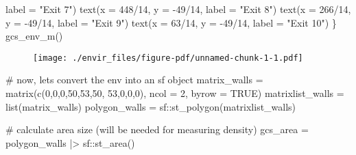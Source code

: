 \documentclass[
  letterpaper,
  DIV=11,
  numbers=noendperiod]{scrreprt}
\newenvironment{Shaded}{\begin{snugshade}}{\end{snugshade}}
\newcommand{\AttributeTok}[1]{\textcolor[rgb]{0.40,0.45,0.13}{#1}}
\newcommand{\CommentTok}[1]{\textcolor[rgb]{0.37,0.37,0.37}{#1}}
\newcommand{\ConstantTok}[1]{\textcolor[rgb]{0.56,0.35,0.01}{#1}}
\newcommand{\DecValTok}[1]{\textcolor[rgb]{0.68,0.00,0.00}{#1}}
\newcommand{\FunctionTok}[1]{\textcolor[rgb]{0.28,0.35,0.67}{#1}}
\newcommand{\NormalTok}[1]{\textcolor[rgb]{0.00,0.23,0.31}{#1}}
\newcommand{\OtherTok}[1]{\textcolor[rgb]{0.00,0.23,0.31}{#1}}
\newcommand{\SpecialCharTok}[1]{\textcolor[rgb]{0.37,0.37,0.37}{#1}}
\newcommand{\StringTok}[1]{\textcolor[rgb]{0.13,0.47,0.30}{#1}}
\begin{document}
\begin{Shaded}
\begin{Highlighting}[]
       \AttributeTok{label =} \StringTok{"Exit 7"}\NormalTok{)}
  \FunctionTok{text}\NormalTok{(}\AttributeTok{x =} \DecValTok{448}\SpecialCharTok{/}\DecValTok{14}\NormalTok{,}
       \AttributeTok{y =} \SpecialCharTok{{-}}\DecValTok{49}\SpecialCharTok{/}\DecValTok{14}\NormalTok{,}
       \AttributeTok{label =} \StringTok{"Exit 8"}\NormalTok{)}
  \FunctionTok{text}\NormalTok{(}\AttributeTok{x =} \DecValTok{266}\SpecialCharTok{/}\DecValTok{14}\NormalTok{, }
       \AttributeTok{y =} \SpecialCharTok{{-}}\DecValTok{49}\SpecialCharTok{/}\DecValTok{14}\NormalTok{,}
       \AttributeTok{label =} \StringTok{"Exit 9"}\NormalTok{)}
  \FunctionTok{text}\NormalTok{(}\AttributeTok{x =} \DecValTok{63}\SpecialCharTok{/}\DecValTok{14}\NormalTok{,}
       \AttributeTok{y =} \SpecialCharTok{{-}}\DecValTok{49}\SpecialCharTok{/}\DecValTok{14}\NormalTok{,}
       \AttributeTok{label =} \StringTok{"Exit 10"}\NormalTok{)}
\NormalTok{\}}
\FunctionTok{gcs\_env\_m}\NormalTok{()}
\end{Highlighting}
\end{Shaded}

\begin{figure}[H]

{\centering \texttt{[image: ./envir\_files/figure-pdf/unnamed-chunk-1-1.pdf]}

}

\end{figure}

\begin{Shaded}
\begin{Highlighting}[]
\CommentTok{\# now, let\textquotesingle{}s convert the env into an sf object}
\NormalTok{matrix\_walls }\OtherTok{=} \FunctionTok{matrix}\NormalTok{(}\FunctionTok{c}\NormalTok{(}\DecValTok{0}\NormalTok{,}\DecValTok{0}\NormalTok{,}\DecValTok{0}\NormalTok{,}\DecValTok{50}\NormalTok{,}\DecValTok{53}\NormalTok{,}\DecValTok{50}\NormalTok{, }\DecValTok{53}\NormalTok{,}\DecValTok{0}\NormalTok{,}\DecValTok{0}\NormalTok{,}\DecValTok{0}\NormalTok{),}
                      \AttributeTok{ncol =} \DecValTok{2}\NormalTok{,}
                      \AttributeTok{byrow =} \ConstantTok{TRUE}\NormalTok{)}
\NormalTok{matrixlist\_walls }\OtherTok{=} \FunctionTok{list}\NormalTok{(matrix\_walls)}
\NormalTok{polygon\_walls }\OtherTok{=}\NormalTok{ sf}\SpecialCharTok{::}\FunctionTok{st\_polygon}\NormalTok{(matrixlist\_walls)}

\CommentTok{\# calculate area size (will be needed for measuring density)}
\NormalTok{gcs\_area }\OtherTok{=}\NormalTok{ polygon\_walls }\SpecialCharTok{|\textgreater{}}\NormalTok{ sf}\SpecialCharTok{::}\FunctionTok{st\_area}\NormalTok{()}
\end{Highlighting}
\end{Shaded}
\end{document}
